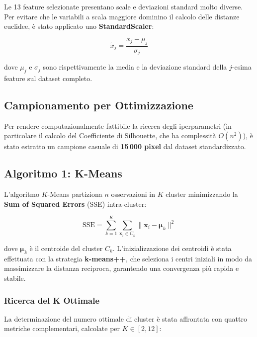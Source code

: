 \documentclass[a4paper,12pt]{article}
\newcommand{\kmeans}{$K$\nobreakdash-Means}
\begin{document}
Le 13 feature selezionate presentano scale e deviazioni standard molto
diverse. Per evitare che le variabili a scala maggiore dominino
il calcolo delle distanze euclidee, è stato applicato uno
\textbf{StandardScaler}:

\begin{equation}
    \tilde{x}_j = \frac{x_j - \mu_j}{\sigma_j}
    \label{eq:scaler}
\end{equation}

dove $\mu_j$ e $\sigma_j$ sono rispettivamente la media e la deviazione
standard della $j$-esima feature sul dataset completo.

\subsection{Campionamento per Ottimizzazione}

Per rendere computazionalmente fattibile la ricerca degli iperparametri
(in particolare il calcolo del Coefficiente di Silhouette, che ha
complessità $O(n^2)$), è stato estratto un campione casuale
di \textbf{15\,000 pixel} dal dataset standardizzato.

\subsection{Algoritmo 1: K-Means}

L'algoritmo \kmeans{} partiziona $n$ osservazioni in $K$ cluster
minimizzando la \textbf{Sum of Squared Errors} (SSE) intra-cluster:

\begin{equation}
    \text{SSE} = \sum_{k=1}^{K} \sum_{\mathbf{x}_i \in C_k}
    \|\mathbf{x}_i - \boldsymbol{\mu}_k\|^2
    \label{eq:sse}
\end{equation}

dove $\boldsymbol{\mu}_k$ è il centroide del cluster $C_k$.
L'inizializzazione dei centroidi è stata effettuata con la strategia
\textbf{k-means++}, che seleziona i centri iniziali in modo da
massimizzare la distanza reciproca, garantendo una convergenza più
rapida e stabile.

\subsubsection{Ricerca del K Ottimale}

La determinazione del numero ottimale di cluster è stata affrontata con
quattro metriche complementari, calcolate per $K \in [2, 12]$:
\end{document}

